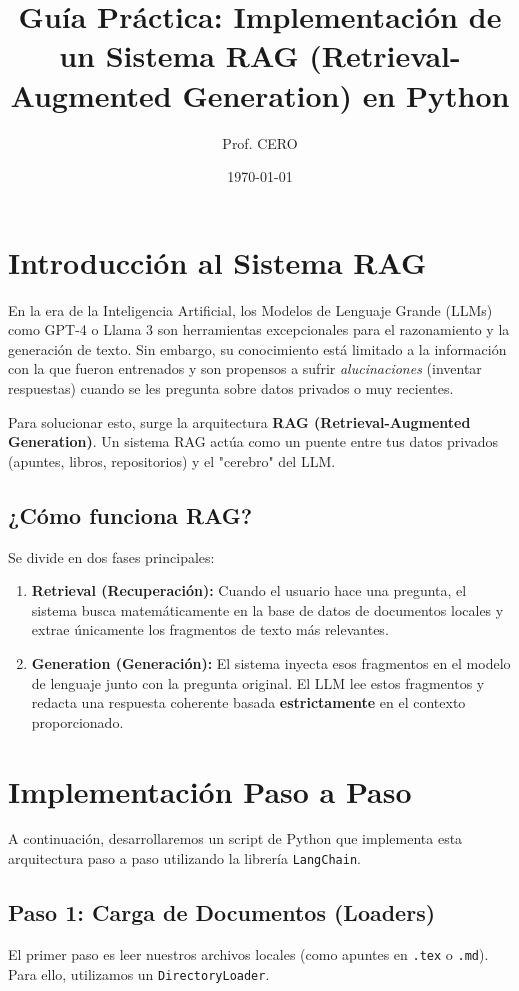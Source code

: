 \documentclass[12pt,a4paper]{article}
\title{Guía Práctica: Implementación de un Sistema RAG (Retrieval-Augmented Generation) en Python}
\author{Prof. CERO}
\date{\today}
\begin{document}
\maketitle
\tableofcontents
\newpage

\section{Introducción al Sistema RAG}

En la era de la Inteligencia Artificial, los Modelos de Lenguaje Grande (LLMs) como GPT-4 o Llama 3 son herramientas excepcionales para el razonamiento y la generación de texto. Sin embargo, su conocimiento está limitado a la información con la que fueron entrenados y son propensos a sufrir \textit{alucinaciones} (inventar respuestas) cuando se les pregunta sobre datos privados o muy recientes.

Para solucionar esto, surge la arquitectura \textbf{RAG (Retrieval-Augmented Generation)}. Un sistema RAG actúa como un puente entre tus datos privados (apuntes, libros, repositorios) y el "cerebro" del LLM.

\subsection{¿Cómo funciona RAG?}
Se divide en dos fases principales:
\begin{enumerate}
    \item \textbf{Retrieval (Recuperación):} Cuando el usuario hace una pregunta, el sistema busca matemáticamente en la base de datos de documentos locales y extrae únicamente los fragmentos de texto más relevantes.
    \item \textbf{Generation (Generación):} El sistema inyecta esos fragmentos en el modelo de lenguaje junto con la pregunta original. El LLM lee estos fragmentos y redacta una respuesta coherente basada \textbf{estrictamente} en el contexto proporcionado.
\end{enumerate}

\section{Implementación Paso a Paso}

A continuación, desarrollaremos un script de Python que implementa esta arquitectura paso a paso utilizando la librería \texttt{LangChain}.

\subsection{Paso 1: Carga de Documentos (Loaders)}
El primer paso es leer nuestros archivos locales (como apuntes en \texttt{.tex} o \texttt{.md}). Para ello, utilizamos un \texttt{DirectoryLoader}.
\end{document}
